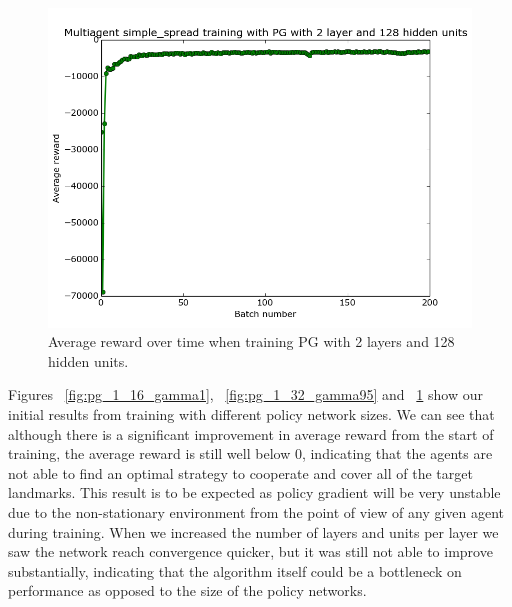 \documentclass{article}
\begin{document}
\begin{figure}
\centering
    \includegraphics[scale=0.25]{pg_2_128_gamma1}
    \caption{Average reward over time when training PG with 2 layers and 128 hidden units.}
\label{fig:pg_2_128_gamma1}
\end{figure}

Figures ~\ref{fig:pg_1_16_gamma1}, ~\ref{fig:pg_1_32_gamma95}  and ~\ref{fig:pg_2_128_gamma1} show our initial results from training with different policy network sizes. We can see that although there is a significant improvement in average reward from the start of training, the average reward is still well below 0, indicating that the agents are not able to find an optimal strategy to cooperate and cover all of the target landmarks. This result is to be expected as policy gradient will be very unstable due to the non-stationary environment from the point of view of any given agent during training. When we increased the number of layers and units per layer we saw the network reach convergence quicker, but it was still not able to improve substantially, indicating that the algorithm itself could be a bottleneck on performance as opposed to the size of the policy networks.



\end{document}
